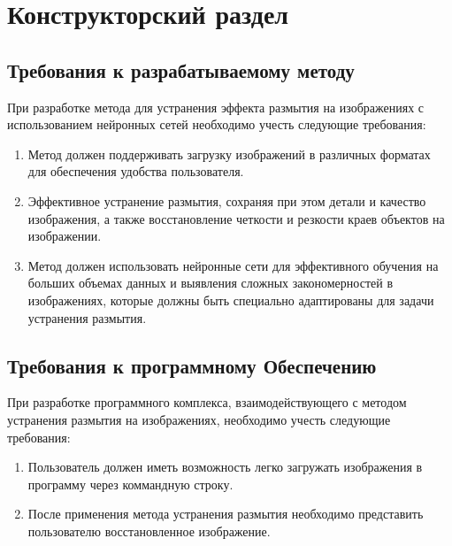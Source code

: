 \chapter{Конструкторский раздел}


\section{Требования к разрабатываемому методу}

При разработке метода для устранения эффекта размытия на изображениях с использованием нейронных сетей необходимо учесть следующие требования:

\begin{enumerate}
    \item Метод должен поддерживать загрузку изображений в различных форматах для обеспечения удобства пользователя.

    \item Эффективное устранение размытия, сохраняя при этом детали и качество изображения, а также восстановление четкости и резкости краев объектов на изображении.


    \item Метод должен использовать нейронные сети для эффективного обучения на больших объемах данных и выявления сложных закономерностей в изображениях, которые должны быть специально адаптированы для задачи устранения размытия.
\end{enumerate}

\section{Требования к программному Обеспечению}

При разработке программного комплекса, взаимодействующего с методом устранения размытия на изображениях, необходимо учесть следующие требования:

\begin{enumerate}
    \item Пользователь должен иметь возможность легко загружать изображения в программу через коммандную строку.

    \item После применения метода устранения размытия необходимо представить пользователю восстановленное изображение.
\end{enumerate}

